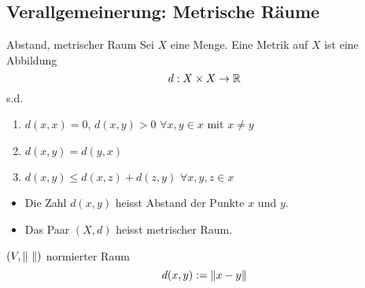 \subsection{Verallgemeinerung: Metrische Räume}
\begin{Def}{Abstand, metrischer Raum}
  Sei $X$ eine Menge. Eine Metrik auf $X$ ist eine Abbildung
  \[d:X\times X\to\mathbb{R}\]
  s.d.
  \begin{enumerate}
    \item $d(x,x)=0$, $d(x,y)>0$ $\forall x,y\in x$ mit $x\neq y$
    \item $d(x,y)=d(y,x)$
    \item $d(x,y)\leq d(x,z)+d(z,y)$ $\forall x,y,z\in x$
  \end{enumerate}
  \begin{itemize}
    \item Die Zahl $d(x,y)$ heisst Abstand der Punkte $x$ und $y$.
    \item Das Paar $(X,d)$ heisst metrischer Raum.
  \end{itemize}
\end{Def}
\begin{Bsp}
  $(V,\left\| \  \right\|)$ normierter Raum
  \[d(x,y):=\left\| x-y \right\|\]
\end{Bsp}
